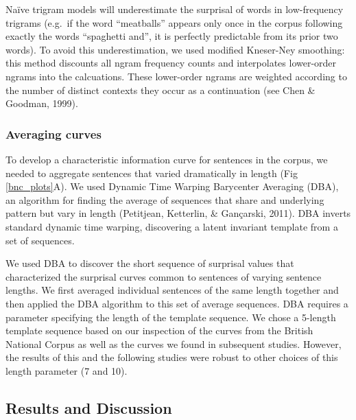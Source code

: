 \documentclass[10pt, letterpaper]{article}
\begin{document}
Naïve trigram models will underestimate the surprisal of words in
low-frequency trigrams (e.g.~if the word ``meatballs'' appears only once
in the corpus following exactly the words ``spaghetti and'', it is
perfectly predictable from its prior two words). To avoid this
underestimation, we used modified Kneser-Ney smoothing: this method
discounts all ngram frequency counts and interpolates lower-order ngrams
into the calcuations. These lower-order ngrams are weighted according to
the number of distinct contexts they occur as a continuation (see Chen
\& Goodman, 1999).

\hypertarget{averaging-curves}{%
\subsubsection{Averaging curves}\label{averaging-curves}}

To develop a characteristic information curve for sentences in the
corpus, we needed to aggregate sentences that varied dramatically in
length (Fig \ref{bnc_plots}A). We used Dynamic Time Warping Barycenter
Averaging (DBA), an algorithm for finding the average of sequences that
share and underlying pattern but vary in length (Petitjean, Ketterlin,
\& Gançarski, 2011). DBA inverts standard dynamic time warping,
discovering a latent invariant template from a set of sequences.

We used DBA to discover the short sequence of surprisal values that
characterized the surprisal curves common to sentences of varying
sentence lengths. We first averaged individual sentences of the same
length together and then applied the DBA algorithm to this set of
average sequences. DBA requires a parameter specifying the length of the
template sequence. We chose a 5-length template sequence based on our
inspection of the curves from the British National Corpus as well as the
curves we found in subsequent studies. However, the results of this and
the following studies were robust to other choices of this length
parameter (7 and 10).

\hypertarget{results-and-discussion}{%
\subsection{Results and Discussion}\label{results-and-discussion}}
\end{document}
